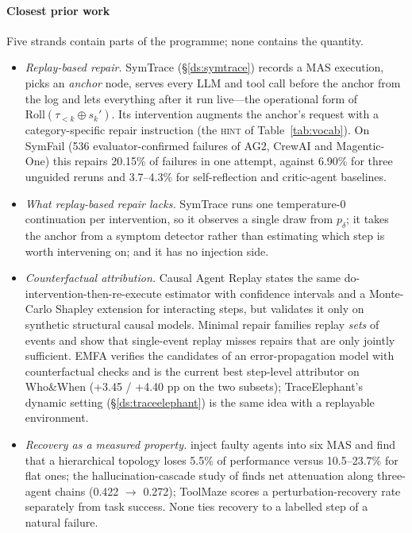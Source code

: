 \paragraph{Closest prior work} Five strands contain parts of the programme; none contains the quantity.
\begin{itemize}[leftmargin=1.1em]
\item \emph{Replay-based repair.} SymTrace \cite{luan2026symtrace} (\S\ref{ds:symtrace}) records a MAS execution, picks an \emph{anchor} node, serves every LLM and tool call before the anchor from the log and lets everything after it run live---the operational form of $\mathrm{Roll}(\tau_{<k}\oplus s_k')$. Its intervention augments the anchor's request with a category-specific repair instruction (the \textsc{hint} of Table~\ref{tab:vocab}). On SymFail (536 evaluator-confirmed failures of AG2, CrewAI and Magentic-One) this repairs 20.15\% of failures in one attempt, against 6.90\% for three unguided reruns and 3.7--4.3\% for self-reflection and critic-agent baselines.
\item \emph{What replay-based repair lacks.} SymTrace runs one temperature-0 continuation per intervention, so it observes a single draw from $p_\delta$; it takes the anchor from a symptom detector rather than estimating which step is worth intervening on; and it has no injection side.
\item \emph{Counterfactual attribution.} Causal Agent Replay \cite{shah2026car} states the same do-intervention-then-re-execute estimator with confidence intervals and a Monte-Carlo Shapley extension for interacting steps, but validates it only on synthetic structural causal models. Minimal repair families \cite{li2026mrfr} replay \emph{sets} of events and show that single-event replay misses repairs that are only jointly sufficient. EMFA \cite{liao2026emfa} verifies the candidates of an error-propagation model with counterfactual checks and is the current best step-level attributor on Who\&When (+3.45 / +4.40 pp on the two subsets); TraceElephant's dynamic setting (\S\ref{ds:traceelephant}) is the same idea with a replayable environment.
\item \emph{Recovery as a measured property.} \citet{huang2024resilience} inject faulty agents into six MAS and find that a hierarchical topology loses 5.5\% of performance versus 10.5--23.7\% for flat ones; the hallucination-cascade study of \citet{jamshidi2026cascade} finds net attenuation along three-agent chains (0.422 $\to$ 0.272); ToolMaze \cite{zhu2026toolmaze} scores a perturbation-recovery rate separately from task success. None ties recovery to a labelled step of a natural failure.

\end{itemize}
